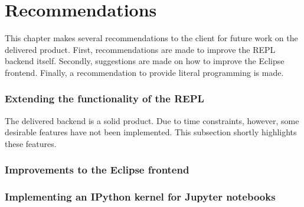 \chapter{Recommendations}
\label{cha:recommendations}

This chapter makes several recommendations to the client for future work on the
delivered product. First, recommendations are made to improve the REPL backend
itself. Secondly, suggestions are made on how to improve the Eclipse frontend.
Finally, a recommendation to provide literal programming is made.

\subsection{Extending the functionality of the REPL}
\label{ssec:impr-backend}

The delivered backend is a solid product. Due to time constraints, however, some
desirable features have not been implemented. This subsection shortly highlights
these features.





\subsection{Improvements to the Eclipse frontend}
\label{ssec:impr-eclipse}



\subsection{Implementing an IPython kernel for Jupyter notebooks}
\label{ssec:discuss-literate-programming}



